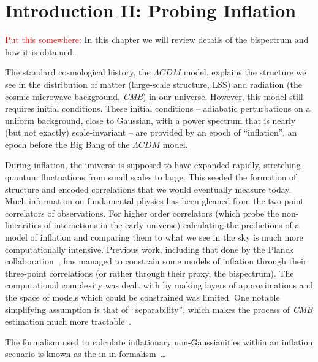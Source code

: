 %
\chapter{Introduction II: Probing Inflation}\label{chapter:intro_bispectra}
\textcolor{red}{Put this somewhere:}
In this chapter we will review details of the bispectrum and how it is obtained.


The standard cosmological history, the $\Lambda CDM$ model, explains the structure we see in the distribution of matter (large-scale structure, LSS) and radiation (the cosmic microwave background, \textit{CMB}) in our universe. However, this model still requires initial conditions. These initial conditions – adiabatic perturbations on a uniform background, close to Gaussian, with a power spectrum that is nearly (but not exactly) scale-invariant – are provided by an epoch of “inflation”, an epoch before the Big Bang of the $\Lambda CDM$ model. 

During inflation, the universe is supposed to have expanded rapidly, stretching quantum fluctuations from small scales to large. This seeded the formation of structure and encoded correlations that we would eventually measure today.
Much information on fundamental physics has been gleaned from the two-point correlators of observations. For higher order correlators (which probe the non-linearities of interactions in the early universe) calculating the predictions of a model of inflation and comparing them to what we see in the sky is much more computationally intensive. Previous work, including that done by the Planck collaboration~\cite{Planck_NG_2018}, has managed to constrain some models of inflation through their three-point correlations (or rather through their proxy, the bispectrum).
The computational complexity was dealt with by making layers of approximations and the space
of models which could be constrained was limited.
One notable simplifying assumption is that of “separability”, which makes the process of \textit{CMB} estimation much more tractable~\cite{Komatsu_2005}.


The formalism used to calculate inflationary non-Gaussianities within an inflation scenario is
known as the in-in formalism~\cite{weinberg_in_in}\ldots




